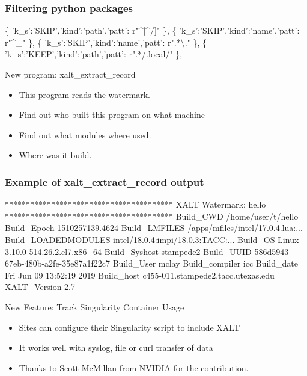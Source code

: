 \documentclass{beamer}
\begin{document}
\begin{frame}[fragile]
    \frametitle{Filtering python packages}
 {\small
    \begin{semiverbatim}
\{ 'k\_s':'SKIP','kind':'path','patt': r"^[^/]" \},
\{ 'k\_s':'SKIP','kind':'name','patt': r"^_"    \},
\{ 'k\_s':'SKIP','kind':'name','patt': r".*\textbackslash." \},
\{ 'k\_s':'KEEP','kind':'path','patt': r".*/.local/" \},
    \end{semiverbatim}
}
\end{frame}

\begin{frame}{New program: xalt\_extract\_record}
  \begin{itemize}
    \item This program reads the watermark.
    \item Find out who built this program on what machine
    \item Find out what modules where used.
    \item Where was it build. 
  \end{itemize}
\end{frame}

\begin{frame}[fragile]
    \frametitle{Example of xalt\_extract\_record output}
 {\tiny
    \begin{semiverbatim}
****************************************
XALT Watermark: hello
****************************************
Build\_CWD            /home/user/t/hello
Build\_Epoch          1510257139.4624
Build\_LMFILES        /apps/mfiles/intel/17.0.4.lua:...
Build\_LOADEDMODULES  intel/18.0.4:impi/18.0.3:TACC:...
Build\_OS             Linux 3.10.0-514.26.2.el7.x86_64
Build\_Syshost        stampede2
Build\_UUID           586d5943-67eb-480b-a2fe-35e87a1f22c7
Build\_User           mclay
Build\_compiler       icc
Build\_date           Fri Jun 09 13:52:19 2019
Build\_host           c455-011.stampede2.tacc.utexas.edu
XALT\_Version         2.7
    \end{semiverbatim}
}
\end{frame}

\begin{frame}{New Feature: Track Singularity Container Usage}
  \begin{itemize}
    \item Sites can configure their Singularity script to include XALT
    \item It works well with syslog, file  or curl transfer of data
    \item Thanks to Scott McMillan from NVIDIA for the contribution.
  \end{itemize}
\end{frame}
\end{document}
